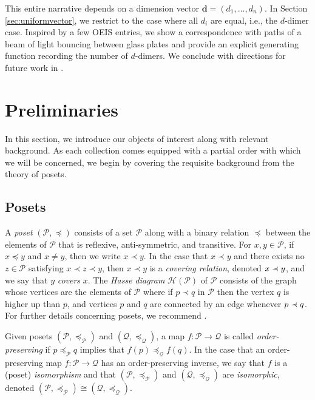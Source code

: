\documentclass{amsart}
\theoremstyle{definition}
\newcommand{\precdot}{\prec\mathrel{\mkern-5mu}\mathrel{\cdot}}
\begin{document}
This entire narrative depends on a dimension vector $\mathbf{d} = (d_1,\ldots,d_n)$. In Section \ref{sec:uniformvector}, we restrict to the case where all $d_i$ are equal, i.e., the $d$-dimer case. Inspired by a few OEIS entries, we show a correspondence with paths of a beam of light bouncing between glass plates and provide an explicit generating function recording the number of $d$-dimers.  We conclude with directions for future work in .


\section{Preliminaries}\label{sec:prelim}

In this section, we introduce our objects of interest along with relevant background. As each collection comes equipped with a partial order with which we will be concerned, we begin by covering the requisite background from the theory of posets.

\subsection{Posets}

A \emph{poset} $(\mathcal{P},\preceq)$ consists of a set $\mathcal{P}$ along with a binary relation $\preceq$ between the elements of $\mathcal{P}$ that is
reflexive, anti-symmetric, and transitive. 
For $x,y\in\mathcal{P}$, if $x\preceq y$ and $x\neq y$, then we write $x\prec y$. 
In the case that $x\prec y$ and there exists no $z\in \mathcal{P}$ satisfying $x\prec z\prec y$, then $x\prec y$ is a \emph{covering relation}, denoted $x\precdot y$, and we say that $y$ \emph{covers} $x$. The \emph{Hasse diagram} $\mathcal{H}(\mathcal{P})$ of $\mathcal{P}$ consists of the graph whose vertices are the elements of $\mathcal{P}$ where if $p\prec q$ in $\mathcal{P}$ then the vertex $q$ is higher up than $p$, and vertices $p$ and $q$ are connected by an edge whenever $p\precdot q$. For further details concerning posets, we recommend \cite{EC1}. 


Given posets $(\mathcal{P},\preceq_{\mathcal{P}})$ and $(\mathcal{Q},\preceq_{\mathcal{Q}})$, a map $f:\mathcal{P}\to\mathcal{Q}$ is called \emph{order-preserving} if $p\preceq_\mathcal{P} q$ implies that $f(p)\preceq_\mathcal{Q} f(q)$. In the case that an order-preserving map $f:\mathcal{P}\to\mathcal{Q}$ has an order-preserving inverse, we say that $f$ is a (poset) \emph{isomorphism} and that $(\mathcal{P},\preceq_{\mathcal{P}})$ and $(\mathcal{Q},\preceq_{\mathcal{Q}})$ are \emph{isomorphic}, denoted $(\mathcal{P},\preceq_{\mathcal{P}})\cong(\mathcal{Q},\preceq_{\mathcal{Q}})$. 
\end{document}
